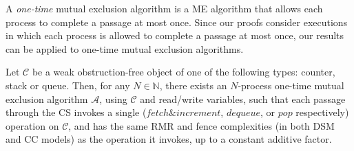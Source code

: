 	A \emph{one-time} mutual exclusion algorithm is a ME algorithm that allows each process to complete a passage at most once. Since our proofs consider executions in which each process is allowed to complete a passage at most once, our results can be applied to one-time mutual exclusion algorithms.
	
	\begin{lemma} \label{lem: ME-using-object}
		Let $\mathcal{C}$ be a weak obstruction-free object of one of the following types: counter, stack or queue. Then, for any $N \in \mathbb{N}$, there exists an $N$-process one-time mutual exclusion algorithm $\mathcal{A}$, using $\mathcal{C}$ and read/write variables, such that each passage through the CS invokes a single ($fetch \& increment$, $dequeue$, or $pop$ respectively) operation on $\mathcal{C}$, and has the same RMR and fence complexities (in both DSM and CC models) as the operation it invokes, up to a constant additive factor.
	\end{lemma}
	
